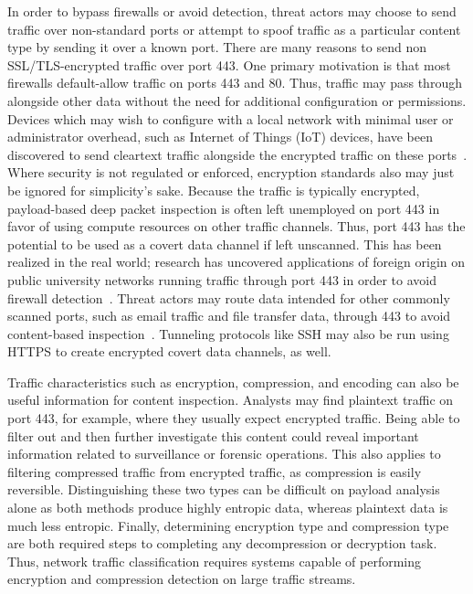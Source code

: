In order to bypass firewalls or avoid detection, threat actors may choose to send traffic over non-standard ports or attempt to spoof traffic as a particular content type by sending it over a known port. There are many reasons to send non SSL/TLS-encrypted traffic over port 443. One primary motivation is that most firewalls default-allow traffic on ports 443 and 80. Thus, traffic may pass through alongside other data without the need for additional configuration or permissions. Devices which may wish to configure with a local network with minimal user or administrator overhead, such as Internet of Things (IoT) devices, have been discovered to send cleartext traffic alongside the encrypted traffic on these ports~\cite{wood2017cleartext}. Where security is not regulated or enforced, encryption standards also may just be ignored for simplicity's sake. Because the traffic is typically encrypted, payload-based deep packet inspection is often left unemployed on port 443 in favor of using compute resources on other traffic channels. Thus, port 443 has the potential to be used as a covert data channel if left unscanned. This has been realized in the real world; research has uncovered applications of foreign origin on public university networks running traffic through port 443 in order to avoid firewall detection~\cite{alcock2016sneaking}. Threat actors may route data intended for other commonly scanned ports, such as email traffic and file transfer data, through 443 to avoid content-based inspection~\cite{paya2009inspecting, lifliand2013encrypted, zander2005automated}. Tunneling protocols like SSH may also be run using HTTPS to create encrypted covert data channels, as well.

Traffic characteristics such as encryption, compression, and encoding can also be useful information for content inspection. Analysts may find plaintext traffic on port 443, for example, where they usually expect encrypted traffic. Being able to filter out and then further investigate this content could reveal important information related to surveillance or forensic operations. This also applies to filtering compressed traffic from encrypted traffic, as compression is easily reversible. Distinguishing these two types can be difficult on payload analysis alone as both methods produce highly entropic data, whereas plaintext data is much less entropic. Finally, determining encryption type and compression type are both required steps to completing any decompression or decryption task. Thus, network traffic classification requires systems capable of performing encryption and compression detection on large traffic streams.

